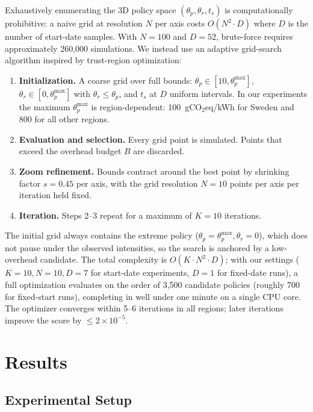 \documentclass[runningheads]{llncs}
\begin{document}
Exhaustively enumerating the 3D policy space $(\theta_p, \theta_r,
t_s)$ is computationally prohibitive: a naive grid at resolution $N$
per axis costs $O(N^2 \cdot D)$ where $D$ is the number of start-date
samples. With $N=100$ and $D=52$, brute-force requires approximately
260,000 simulations. We instead use an adaptive grid-search algorithm
inspired by trust-region optimization:
\begin{enumerate}
  \item {\bf Initialization.} A coarse grid over full bounds:
    $\theta_p \in [10, \theta_p^{\max}]$, $\theta_r \in [0,
    \theta_p^{\max}]$ with $\theta_r \leq \theta_p$, and
    $t_s$ at $D$ uniform intervals. In our experiments the maximum
    $\theta_p^{\max}$ is region-dependent: 100~gCO$_2$eq/kWh for Sweden
    and 800 for all other regions.
  \item {\bf Evaluation and selection.} Every grid point is
    simulated. Points that exceed the overhead budget $B$ are discarded.
  \item {\bf Zoom refinement.} Bounds contract around the best point
    by shrinking factor $s = 0.45$ per axis, with the grid resolution
    $N = 10$ points per axis per iteration held fixed.
  \item {\bf Iteration.} Steps 2--3 repeat for a maximum of $K = 10$ iterations.
\end{enumerate}

The initial grid always contains the extreme policy ($\theta_p =
\theta_p^{\max}, \theta_r = 0$), which does not pause under the
observed intensities, so the search is anchored by a low-overhead
candidate. The total complexity is $O(K \cdot N^2 \cdot D)$; with our
settings ($K=10, N=10, D=7$ for start-date experiments, $D=1$ for
fixed-date runs), a full optimization evaluates on the order of 3,500
candidate policies (roughly 700 for fixed-start runs), completing in
well under one minute on a single CPU core. The optimizer converges
within 5--6 iterations in all regions; later iterations improve the
score by $\leq2\times10^{-5}$.

\section{Results}

\subsection{Experimental Setup}
\end{document}
